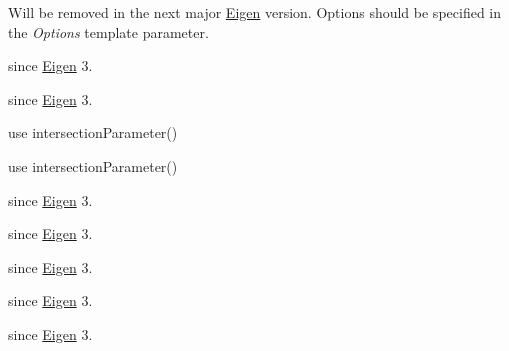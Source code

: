 \begin{DoxyRefList}
\label{deprecated__deprecated000411}%
%
Will be removed in the next major \mbox{\hyperlink{namespace_eigen}{Eigen}} version. Options should be specified in the {\itshape Options} template parameter.  
\item[Member \mbox{\hyperlink{class_eigen_1_1_parametrized_line_ae2d24d0584d1d51e88bf0909f7b63831}{Eigen::Parametrized\+Line::Index}} ]\label{deprecated__deprecated000358}%
%
since \mbox{\hyperlink{namespace_eigen}{Eigen}} 3. 

\label{deprecated__deprecated000400}%
%
since \mbox{\hyperlink{namespace_eigen}{Eigen}} 3.  
\item[Member \mbox{\hyperlink{class_eigen_1_1_parametrized_line_af179a8d59ff3c0aa7975dc38023f4f31}{Eigen::Parametrized\+Line::intersection}} (const Hyperplane$<$ Scalar\+\_\+, Ambient\+Dim\+\_\+, Other\+Options $>$ \&hyperplane) const]\label{deprecated__deprecated000357}%
%
use intersection\+Parameter() 

\label{deprecated__deprecated000399}%
%
use intersection\+Parameter()  
\item[Member \mbox{\hyperlink{class_eigen_1_1_real_q_z_ab2c1b2ec46cea435743e30c4aa591f89}{Eigen::Real\+QZ$<$ Matrix\+Type\+\_\+ $>$::Index}} ]\label{deprecated__deprecated000349}%
%
since \mbox{\hyperlink{namespace_eigen}{Eigen}} 3. 

\label{deprecated__deprecated000391}%
%
since \mbox{\hyperlink{namespace_eigen}{Eigen}} 3.  
\item[Member \mbox{\hyperlink{class_eigen_1_1_real_schur_ad3a6ac65243d901525158f418c4d0582}{Eigen::Real\+Schur$<$ Matrix\+Type\+\_\+ $>$::Index}} ]\label{deprecated__deprecated000350}%
%
since \mbox{\hyperlink{namespace_eigen}{Eigen}} 3. 

\label{deprecated__deprecated000392}%
%
since \mbox{\hyperlink{namespace_eigen}{Eigen}} 3.  
\item[Member \mbox{\hyperlink{class_eigen_1_1_self_adjoint_eigen_solver_a7c52c334cec08ff33425e4b3f5474eb8}{Eigen::Self\+Adjoint\+Eigen\+Solver$<$ Matrix\+Type\+\_\+ $>$::Index}} ]\label{deprecated__deprecated000351}%
%
since \mbox{\hyperlink{namespace_eigen}{Eigen}} 3. 


\end{DoxyRefList}
